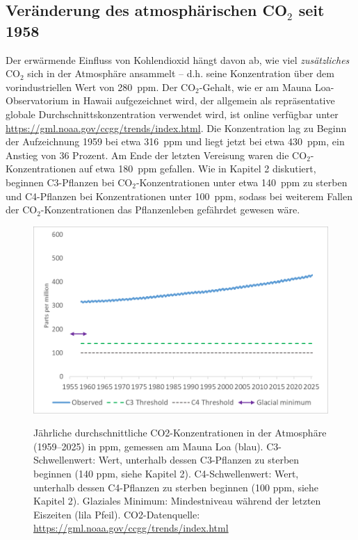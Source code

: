 \documentclass[12pt,paper=a4,DIV=12,parskip=never,chapterprefix=false,headings=standardclasses]{scrreprt}
\numberwithin{figure}{chapter}
\begin{document}
\subsection{Veränderung des atmosphärischen CO$_2$ seit 1958}

Der erwärmende Einfluss von Kohlendioxid hängt davon ab, wie viel \emph{zusätzliches} CO$_2$ sich in der Atmosphäre ansammelt – d.h. seine Konzentration über dem vorindustriellen Wert von \SI{280}{ppm}. Der CO$_2$-Gehalt, wie er am Mauna Loa-Observatorium in Hawaii aufgezeichnet wird, der allgemein als repräsentative globale Durchschnittskonzentration verwendet wird, ist online verfügbar unter \url{https://gml.noaa.gov/ccgg/trends/index.html}. Die Konzentration lag zu Beginn der Aufzeichnung 1959 bei etwa \SI{316}{ppm} und liegt jetzt bei etwa \SI{430}{ppm}, ein Anstieg von 36 Prozent. Am Ende der letzten Vereisung waren die CO$_2$-Konzentrationen auf etwa \SI{180}{ppm} gefallen. Wie in Kapitel 2 diskutiert, beginnen C3-Pflanzen bei CO$_2$-Konzentrationen unter etwa \SI{140}{ppm} zu sterben und C4-Pflanzen bei Konzentrationen unter \SI{100}{ppm}, sodass bei weiterem Fallen der CO$_2$-Konzentrationen das Pflanzenleben gefährdet gewesen wäre.


\begin{figure}[H]
\begin{center}
\includegraphics[width=1.0\textwidth]{bilder/bilderKlima-0009.png}\\[1cm]
\end{center}
\caption{Jährliche durchschnittliche CO2-Konzentrationen in der Atmosphäre (1959–2025) in ppm, gemessen am
Mauna Loa (blau). C3-Schwellenwert: Wert, unterhalb dessen C3-Pflanzen zu sterben beginnen (140 ppm, siehe
Kapitel 2). C4-Schwellenwert: Wert, unterhalb dessen C4-Pflanzen zu sterben beginnen (100 ppm, siehe Kapitel 2).
Glaziales Minimum: Mindestniveau während der letzten Eiszeiten (lila Pfeil). CO2-Datenquelle:
\url{https://gml.noaa.gov/ccgg/trends/index.html}}
\end{figure}
\end{document}
